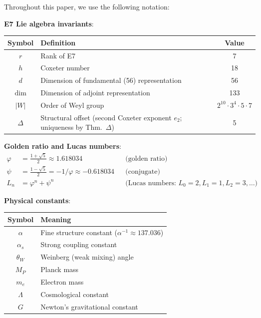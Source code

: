\documentclass[11pt,a4paper]{article}
\begin{document}
Throughout this paper, we use the following notation:

\textbf{E7 Lie algebra invariants}:
\begin{center}
\begin{tabular}{|c|l|c|}
\hline
\textbf{Symbol} & \textbf{Definition} & \textbf{Value} \\
\hline
$r$ & Rank of E7 & 7 \\
$h$ & Coxeter number & 18 \\
$d$ & Dimension of fundamental (56) representation & 56 \\
$\dim$ & Dimension of adjoint representation & 133 \\
$|W|$ & Order of Weyl group & $2^{10} \cdot 3^4 \cdot 5 \cdot 7$ \\
$\Delta$ & Structural offset (second Coxeter exponent $e_2$; uniqueness by Thm.~$\Delta$) & 5 \\
\hline
\end{tabular}
\end{center}

\textbf{Golden ratio and Lucas numbers}:
\begin{align}
\varphi &= \frac{1+\sqrt{5}}{2} \approx 1.618034 && \text{(golden ratio)} \\
\psi &= \frac{1-\sqrt{5}}{2} = -1/\varphi \approx -0.618034 && \text{(conjugate)} \\
L_n &= \varphi^n + \psi^n && \text{(Lucas numbers: } L_0=2, L_1=1, L_2=3, \ldots\text{)}
\end{align}

\textbf{Physical constants}:
\begin{center}
\begin{tabular}{|c|l|}
\hline
\textbf{Symbol} & \textbf{Meaning} \\
\hline
$\alpha$ & Fine structure constant ($\alpha^{-1} \approx 137.036$) \\
$\alpha_s$ & Strong coupling constant \\
$\theta_W$ & Weinberg (weak mixing) angle \\
$M_P$ & Planck mass \\
$m_e$ & Electron mass \\
$\Lambda$ & Cosmological constant \\
$G$ & Newton's gravitational constant \\
\hline
\end{tabular}
\end{center}
\end{document}

